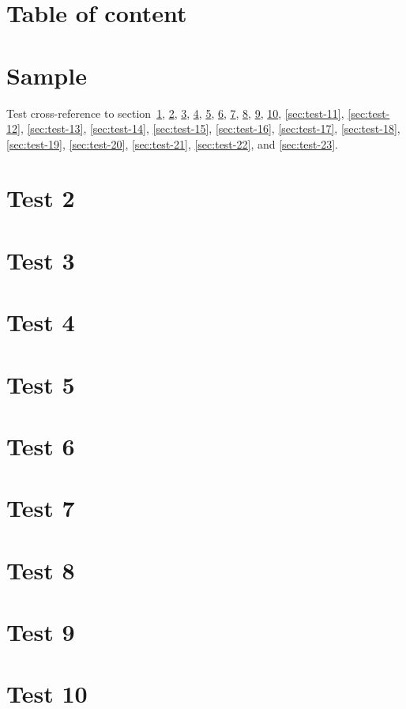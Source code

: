 \documentclass[a4paper]{article}
\begin{document}
\section*{Table of content}
\tableofcontents
\section{Sample}
\label{sec:test-1}
Test cross-reference to section~\ref{sec:test-1}, \ref{sec:test-2}, \ref{sec:test-3},
\ref{sec:test-4}, \ref{sec:test-5}, \ref{sec:test-6},
\ref{sec:test-7}, \ref{sec:test-8}, \ref{sec:test-9},
\ref{sec:test-10}, \ref{sec:test-11}, \ref{sec:test-12},
\ref{sec:test-13}, \ref{sec:test-14}, \ref{sec:test-15},
\ref{sec:test-16}, \ref{sec:test-17}, \ref{sec:test-18},
\ref{sec:test-19}, \ref{sec:test-20}, \ref{sec:test-21},
\ref{sec:test-22}, and \ref{sec:test-23}.
\section{Test 2}
\label{sec:test-2}
\section{Test 3}
\label{sec:test-3}
\section{Test 4}
\label{sec:test-4}
\section{Test 5}
\label{sec:test-5}
\section{Test 6}
\label{sec:test-6}
\section{Test 7}
\label{sec:test-7}
\section{Test 8}
\label{sec:test-8}
\section{Test 9}
\label{sec:test-9}
\section{Test 10}
\label{sec:test-10}
\end{document}

